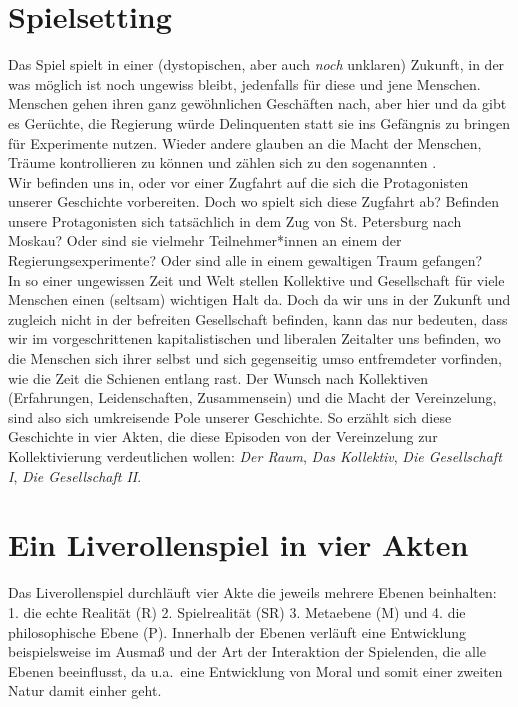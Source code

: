 \documentclass[12pt, a4paper, openany]{report}
\begin{document}
\section{Spielsetting}
Das Spiel spielt in einer (dystopischen, aber auch \emph{noch} unklaren) Zukunft, in der was möglich ist noch ungewiss bleibt, jedenfalls für diese und jene Menschen. 
Menschen gehen ihren ganz gewöhnlichen Geschäften nach, aber hier und da gibt es Gerüchte, die Regierung würde Delinquenten statt sie ins Gefängnis zu bringen für Experimente nutzen. 
Wieder andere glauben an die Macht der Menschen, Träume kontrollieren zu können und zählen sich zu den sogenannten .\\
Wir befinden uns in, oder vor einer Zugfahrt auf die sich die Protagonisten unserer Geschichte vorbereiten.
Doch wo spielt sich diese Zugfahrt ab? 
Befinden unsere Protagonisten sich tatsächlich in dem Zug von St. Petersburg nach Moskau? 
Oder sind sie vielmehr Teilnehmer*innen an einem der Regierungsexperimente? 
Oder sind alle in einem gewaltigen Traum gefangen?\\

In so einer ungewissen Zeit und Welt stellen Kollektive und Gesellschaft für viele Menschen einen (seltsam) wichtigen Halt da. 
Doch da wir uns in der Zukunft und zugleich nicht in der befreiten Gesellschaft befinden, kann das nur bedeuten, dass wir im vorgeschrittenen kapitalistischen und liberalen Zeitalter uns befinden, wo die Menschen sich ihrer selbst und sich gegenseitig umso entfremdeter vorfinden, wie die Zeit die Schienen entlang rast.
Der Wunsch nach Kollektiven (Erfahrungen, Leidenschaften, Zusammensein) und die Macht der Vereinzelung, sind also sich umkreisende Pole unserer Geschichte.
So erzählt sich diese Geschichte in vier Akten, die diese Episoden von der Vereinzelung zur Kollektivierung verdeutlichen wollen: \emph{Der Raum}, \emph{Das Kollektiv}, \emph{Die Gesellschaft I}, \emph{Die Gesellschaft II}.

\section{Ein Liverollenspiel in vier Akten}
Das Liverollenspiel durchläuft vier Akte die jeweils mehrere Ebenen beinhalten: 
1. die echte Realität (R) 2. Spielrealität (SR) 3. Metaebene (M) und 4. die philosophische 
Ebene (P). Innerhalb der Ebenen verläuft eine Entwicklung beispielsweise im Ausmaß und der Art der 
Interaktion der Spielenden, die alle Ebenen beeinflusst, da u.a.~eine Entwicklung von Moral 
und somit einer zweiten Natur damit einher geht.
\end{document}
